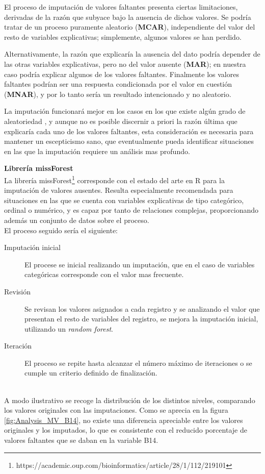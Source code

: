 \documentclass[a4paper, 11pt]{article}
\begin{document}
El proceso de imputación de valores faltantes presenta ciertas limitaciones, derivadas de la
razón que subyace bajo la ausencia de dichos valores. Se podría tratar de un proceso 
puramente aleatorio (\textbf{MCAR}), independiente del valor del resto de variables
explicativas; simplemente, algunos valores se han perdido. 

Alternativamente, la razón que explicaría la ausencia del dato podría depender de las otras 
variables explicativas, pero no del valor ausente (\textbf{MAR}); en nuestra caso podría 
explicar algunos de los valores faltantes. Finalmente los valores faltantes podrían ser una 
respuesta condicionada por el valor en cuestión (\textbf{MNAR}), y por lo tanto sería un 
resultado intencionado y no aleatorio. 

La imputación funcionará mejor en los casos en los que existe algún grado de aleatoriedad \cite{lantz23}, y aunque no es posible discernir a priori la razón
última que explicaría cada uno de los valores faltantes, esta consideración es
necesaria para mantener un escepticismo sano, que eventualmente pueda identificar
situaciones en las que la imputación requiere un análisis mas profundo.
\\

\colorbox{gray!30}{
\begin{minipage}{\textwidth}
\textbf{Librería missForest}\\
  La librería missForest\footnote{https://academic.oup.com/bioinformatics/article/28/1/112/219101}
  corresponde con el estado del arte en R para la imputación de valores
  ausentes. Resulta especialmente recomendada para situaciones en las que se cuenta con variables
  explicativas de tipo categórico, ordinal o numérico, y es capaz por tanto de relaciones complejas,
  proporcionando además un conjunto de datos sobre el proceso.\\

  El proceso seguido sería el siguiente:
  \begin{description}
      \item[Imputación inicial] El procese se inicial realizando un imputación, que en el caso  
      de variables categóricas corresponde con el valor mas frecuente.
      \item[Revisión] Se revisan los valores asignados a cada registro y se analizando el valor
      que presentan el resto de variables del registro, se mejora la imputación inicial, utilizando
      un \textit{random forest}.
      \item[Iteración] El proceso se repite hasta alcanzar el número máximo de iteraciones o se 
      cumple un criterio definido de finalización.
  \end{description}
\end{minipage}
}
\\
A modo ilustrativo se recoge la distribución de los distintos niveles, comparando los valores
originales con las imputaciones. Como se aprecia en la figura \ref{fig:Analysis_MV_B14}, no 
existe una diferencia apreciable entre los valores originales y los imputados, lo que es consistente con el reducido porcentaje de valores faltantes que se daban en la variable B14.
\end{document}
